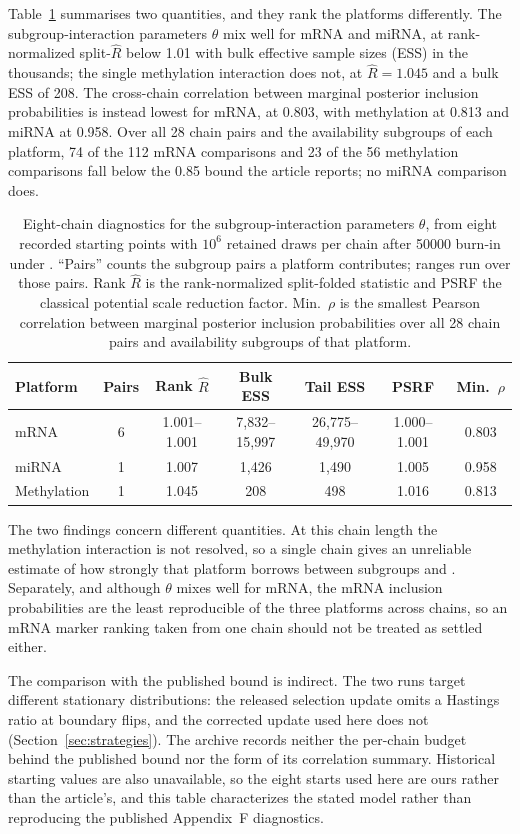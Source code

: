 \documentclass[article]{jss}
\begin{document}
Table~\ref{tab:chain-diagnostics} summarises two quantities, and they rank the
platforms differently. The subgroup-interaction parameters $\theta$ mix well
for mRNA and miRNA, at rank-normalized split-$\widehat{R}$ below 1.01 with bulk
effective sample sizes (ESS) in the thousands; the single methylation
interaction does not, at $\widehat{R}=1.045$ and a bulk ESS of 208. The
cross-chain correlation between marginal posterior inclusion probabilities is
instead lowest for mRNA, at 0.803, with methylation at 0.813 and miRNA at
0.958. Over all 28 chain pairs and the availability subgroups of each platform,
74 of the 112 mRNA comparisons and 23 of the 56 methylation comparisons fall
below the 0.85 bound the article reports; no miRNA comparison does.

\begin{table}[!ht]
\centering
\small
\begin{tabular}{l c c c c c c}
\toprule
Platform & Pairs & Rank $\widehat{R}$ & Bulk ESS & Tail ESS & PSRF &
Min.\ $\rho$ \\
\midrule
mRNA        & 6 & 1.001--1.001 & 7,832--15,997 & 26,775--49,970 & 1.000--1.001 & 0.803 \\
miRNA       & 1 & 1.007        & 1,426         & 1,490          & 1.005        & 0.958 \\
Methylation & 1 & 1.045        & 208           & 498            & 1.016        & 0.813 \\
\bottomrule
\end{tabular}
\caption{\label{tab:chain-diagnostics}Eight-chain diagnostics for the
subgroup-interaction parameters $\theta$, from eight recorded starting points
with $10^6$ retained draws per chain after 50000 burn-in under
. ``Pairs'' counts the subgroup pairs a
platform contributes; ranges run over those pairs. Rank $\widehat{R}$ is the
rank-normalized split-folded statistic and PSRF the classical potential scale
reduction factor. Min.\ $\rho$ is the smallest Pearson correlation between
marginal posterior inclusion probabilities over all 28 chain pairs and
availability subgroups of that platform.}
\end{table}

The two findings concern different quantities. At this chain length the
methylation interaction is not resolved, so a single chain gives an unreliable
estimate of how strongly that platform borrows between subgroups  and
. Separately, and although $\theta$ mixes well for mRNA, the mRNA
inclusion probabilities are the least reproducible of the three platforms
across chains, so an mRNA marker ranking taken from one chain should not be
treated as settled either.

The comparison with the published bound is indirect. The two runs target
different stationary distributions: the released selection update omits a
Hastings ratio at boundary flips, and the corrected  update used
here does not (Section~\ref{sec:strategies}). The archive records neither the
per-chain budget behind the published bound nor the form of its correlation
summary. Historical starting values are also unavailable, so the eight starts
used here are ours rather than the article's, and this table characterizes the
stated model rather than reproducing the published Appendix~F diagnostics.
\end{document}
